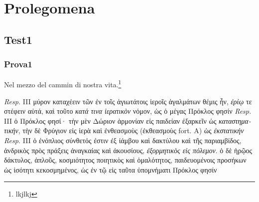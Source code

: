 \documentclass[11pt,a4paper]{book}
\begin{document}
\part{Prolegomena}
\chapter{Test1}
\section{Prova1}
Nel mezzo del cammin di nostra vita.\footnote{lkjlkj}

\bigskip

\begin{small}

\numberlinefalse
\begin{pairs}
    \begin{Leftside}
    \beginnumbering
    \pstart
    \noindent \textit{Resp.} III  \textgreek{μύρον καταχέειν τῶν ἐν τοῖς ἁγιωτάτοις ἱεροῖς ἀγαλμάτων θέμις ἦν, \textit{ἐρίῳ} τε στέφειν αὐτά, καὶ τοῦτο \textit{κατά τινα ἱερατικὸν} νόμον, ὡς ὁ μέγας Πρόκλος φησίν}
    \pend
    \pstart
    \noindent \textit{Resp.} III  \textgreek{ὁ Πρόκλος φησί· τὴν μὲν Δώριον ἁρμονίαν εἰς παιδείαν ἐξαρκεῖν ὡς \textit{καταστηματικήν}, τὴν δὲ Φρύγιον εἰς ἱερὰ καὶ ἐνθεασμοὺς (ἐκθεασμοὺς fort. A) ὡς \textit{ἐκστατικήν}}
    \pend
    \pstart
    \noindent \textit{Resp.} III  \textgreek{ὁ ἐνόπλιος σύνθετός ἐστιν ἐξ ἰάμβου καὶ δακτύλου καὶ τῆς παριαμβίδος, ἀνδρικὸς πρὸς πράξεις ἀναγκαίας καὶ ἀκουσίους, \textit{ἐξορμητικὸς εἰς πόλεμον}. ὁ δὲ ἡρῷος δάκτυλος, ἁπλοῦς, κοσμιότητος ποιητικὸς καὶ ὁμαλότητος, παιδευομένοις προσήκων ὡς ἰσότητι κεκοσμημένος, ὡς ἐν τῷ εἰς ταῦτα ὑπομνήματι Πρόκλος φησίν}
    \pend
    \endnumbering
    \end{Leftside}


\end{pairs}
\end{small}
\end{document}
